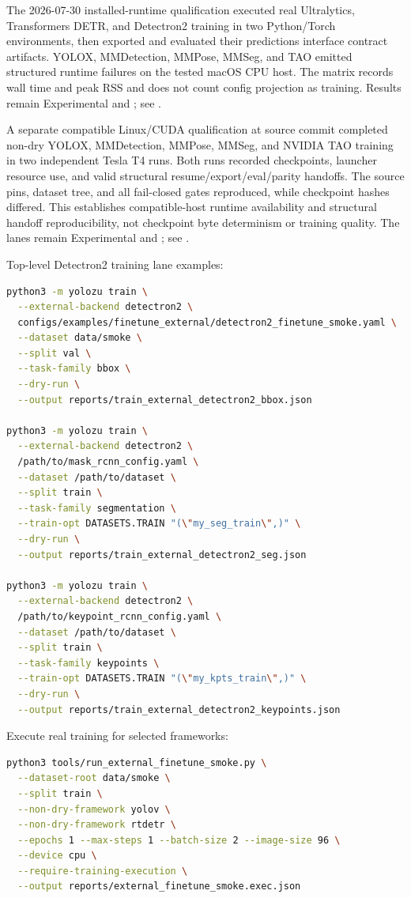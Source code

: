 The 2026-07-30 installed-runtime qualification executed real Ultralytics,
Transformers DETR, and Detectron2 training in two Python/Torch environments,
then exported and evaluated their predictions interface contract artifacts.
YOLOX, MMDetection, MMPose, MMSeg, and TAO emitted structured runtime failures
on the tested macOS CPU host.  The matrix records wall time and peak RSS and
does not count config projection as training.  Results remain Experimental and
; see
.

A separate compatible Linux/CUDA qualification at source commit
 completed non-dry YOLOX, MMDetection, MMPose, MMSeg, and
NVIDIA TAO training in two independent Tesla T4 runs.  Both runs recorded
checkpoints, launcher resource use, and valid structural
resume/export/eval/parity handoffs.  The source pins, dataset tree, and all
fail-closed gates reproduced, while checkpoint hashes differed.  This
establishes compatible-host runtime availability and structural handoff
reproducibility, not checkpoint byte determinism or training quality.  The
lanes remain Experimental and ; see
.

Top-level Detectron2 training lane examples:
\begin{lstlisting}[language=bash]
python3 -m yolozu train \
  --external-backend detectron2 \
  configs/examples/finetune_external/detectron2_finetune_smoke.yaml \
  --dataset data/smoke \
  --split val \
  --task-family bbox \
  --dry-run \
  --output reports/train_external_detectron2_bbox.json

python3 -m yolozu train \
  --external-backend detectron2 \
  /path/to/mask_rcnn_config.yaml \
  --dataset /path/to/dataset \
  --split train \
  --task-family segmentation \
  --train-opt DATASETS.TRAIN "(\"my_seg_train\",)" \
  --dry-run \
  --output reports/train_external_detectron2_seg.json

python3 -m yolozu train \
  --external-backend detectron2 \
  /path/to/keypoint_rcnn_config.yaml \
  --dataset /path/to/dataset \
  --split train \
  --task-family keypoints \
  --train-opt DATASETS.TRAIN "(\"my_kpts_train\",)" \
  --dry-run \
  --output reports/train_external_detectron2_keypoints.json
\end{lstlisting}

Execute real training for selected frameworks:
\begin{lstlisting}[language=bash]
python3 tools/run_external_finetune_smoke.py \
  --dataset-root data/smoke \
  --split train \
  --non-dry-framework yolov \
  --non-dry-framework rtdetr \
  --epochs 1 --max-steps 1 --batch-size 2 --image-size 96 \
  --device cpu \
  --require-training-execution \
  --output reports/external_finetune_smoke.exec.json
\end{lstlisting}

